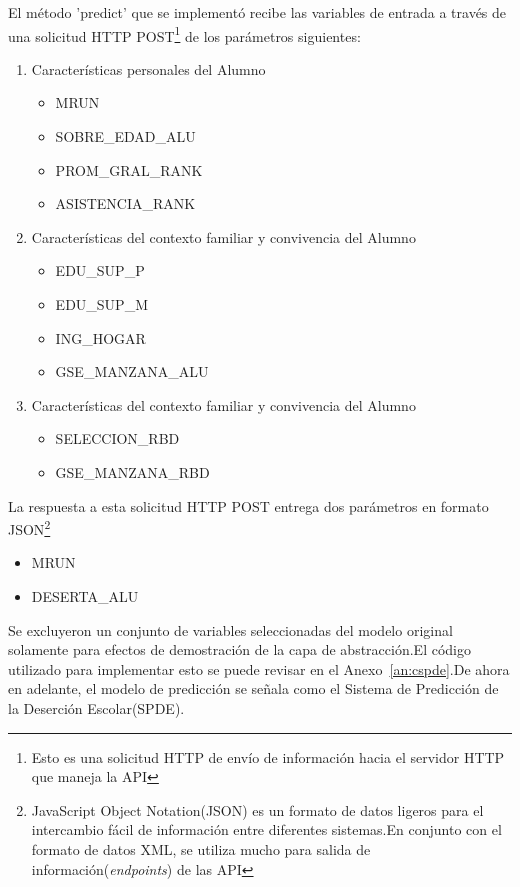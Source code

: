 El método 'predict' que se implementó recibe las variables de entrada a través de una solicitud HTTP POST\footnote{Esto es una solicitud HTTP de envío de información hacia el servidor HTTP que maneja la API} de los parámetros siguientes:
\begin{enumerate}
\item Características personales del Alumno
    \begin{itemize}
    \item MRUN
    \item SOBRE_EDAD_ALU
    \item PROM_GRAL_RANK
    \item ASISTENCIA_RANK
    \end{itemize}
\item Características del contexto familiar y convivencia del Alumno
    \begin{itemize}
    \item EDU_SUP_P
    \item EDU_SUP_M
    \item ING_HOGAR
    \item GSE_MANZANA_ALU
    \end{itemize}
\item Características del contexto familiar y convivencia del Alumno
    \begin{itemize}
    \item SELECCION_RBD
    \item GSE_MANZANA_RBD
    \end{itemize}
\end{enumerate}
La respuesta a esta solicitud HTTP POST entrega dos parámetros en formato JSON\footnote{JavaScript Object Notation(JSON) es un formato de datos ligeros para el intercambio fácil de información entre diferentes sistemas.En conjunto con el formato de datos XML, se utiliza mucho para salida de información(\textit{endpoints}) de las API}
\begin{itemize}
\item MRUN
\item DESERTA_ALU
\end{itemize}

Se excluyeron un conjunto de variables seleccionadas del modelo original solamente para efectos de demostración de la capa de abstracción.El código utilizado para implementar esto se puede revisar en el Anexo~\ref{an:cspde}.De ahora en adelante, el modelo de predicción se señala como el Sistema de Predicción de la Deserción Escolar(SPDE).

